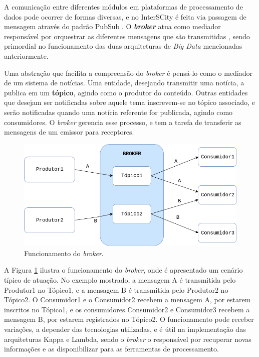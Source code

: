 A comunicação entre diferentes módulos em plataformas de processamento de dados
pode ocorrer de formas diversas, e no InterSCity é feita via passagem de
mensagem através do padrão PubSub \cite{delesposte2017}.
O \textbf{\textit{broker}} atua como mediador responsável por orquestrar as diferentes
mensagens que são transmitidas \cite{marz2015}, sendo primordial no
funcionamento das duas arquiteturas de \textit{Big Data} mencionadas anteriormente.

Uma abstração que facilita a compreensão do \textit{broker} é pensá-lo como o
mediador de um sistema de notícias. Uma entidade, desejando transmitir
uma notícia, a publica em um \textbf{tópico}, agindo como o produtor do
conteúdo. Outras entidades que desejam ser notificadas sobre aquele tema
inscrevem-se no tópico associado, e serão notificadas quando uma notícia referente
for publicada, agindo como consumidores. O \textit{broker} gerencia esse
processo, e tem a tarefa de transferir as mensagens de um emissor para
receptores.

\begin{figure}[hbt]
  \centering
    \includegraphics[scale=0.5]{figuras/broker.png}
    \caption{Funcionamento do \textit{broker}.}
  \label{fig:broker}
\end{figure}

A Figura \ref{fig:broker} ilustra o funcionamento do \textit{broker}, onde é
apresentado um cenário típico de atuação. No exemplo mostrado, a mensagem A
é transmitida pelo Produtor1 no Tópico1, e a mensagem B é transmitida pelo
Produtor2 no Tópico2. O Consumidor1 e o Consumidor2 recebem a mensagem A, por
estarem inscritos no Tópico1, e os consumidores Consumidor2 e Consumidor3
recebem a mensagem B, por estarem registrados no Tópico2. O funcionamento
pode receber variações, a depender das tecnologias utilizadas, e é útil
na implementação das arquiteturas Kappa e Lambda, sendo o
\textit{broker} o responsável por recuperar novas informações e as
disponibilizar para as ferramentas de processamento.

